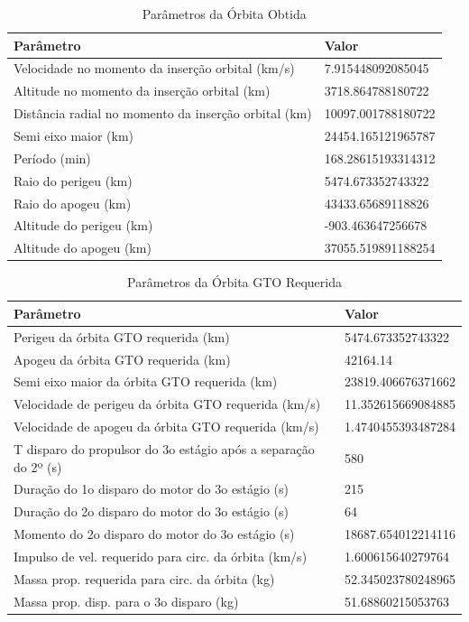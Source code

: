\begin{table}[H]
\centering
\caption{Parâmetros da Órbita Obtida}
\begin{tabular}{|l|l|}
\hline
\textbf{Parâmetro} & \textbf{Valor} \\
\hline
Velocidade no momento da inserção orbital (km/s) & 7.915448092085045 \\
Altitude no momento da inserção orbital (km) & 3718.864788180722 \\
Distância radial no momento da inserção orbital (km) & 10097.001788180722 \\
Semi eixo maior (km) & 24454.165121965787 \\
Período (min) & 168.28615193314312 \\
Raio do perigeu (km) & 5474.673352743322 \\
Raio do apogeu (km) & 43433.65689118826 \\
Altitude do perigeu (km) & -903.463647256678 \\
Altitude do apogeu (km) & 37055.519891188254 \\
\hline
\end{tabular}

\end{table}

\begin{table}[H]
\centering
\caption{Parâmetros da Órbita GTO Requerida}
\begin{tabular}{|l|l|}
\hline
\textbf{Parâmetro} & \textbf{Valor} \\
\hline
Perigeu da órbita GTO requerida (km) & 5474.673352743322 \\
Apogeu da órbita GTO requerida (km) & 42164.14 \\
Semi eixo maior da órbita GTO requerida (km) & 23819.406676371662 \\
Velocidade de perigeu da órbita GTO requerida (km/s) & 11.352615669084885 \\
Velocidade de apogeu da órbita GTO requerida (km/s) & 1.4740455393487284 \\
T disparo do propulsor do 3o estágio após a separação do 2º (s) & 580 \\
Duração do 1o disparo do motor do 3o estágio (s) & 215 \\
Duração do 2o disparo do motor do 3o estágio (s) & 64 \\
Momento do 2o disparo do motor do 3o estágio (s) & 18687.654012214116 \\
Impulso de vel. requerido para circ. da órbita (km/s) & 1.600615640279764 \\
Massa prop. requerida para circ. da órbita (kg) & 52.345023780248965 \\
Massa prop. disp. para o 3o disparo (kg) & 51.68860215053763 \\
\hline
\end{tabular}

\end{table}

